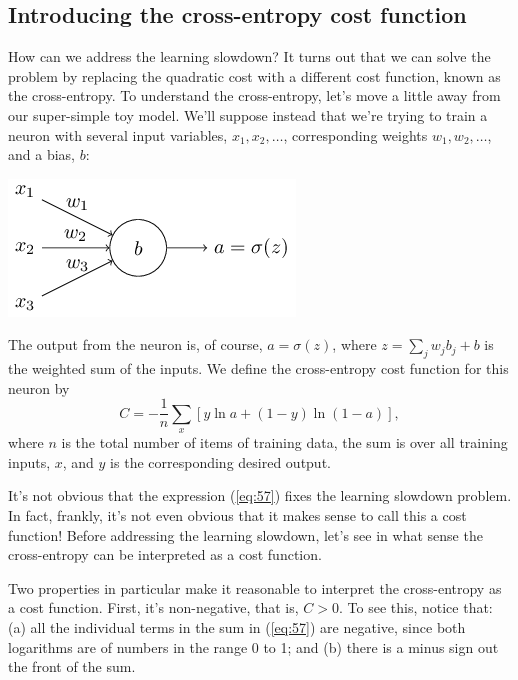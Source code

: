 \documentclass[a4paper,twoside,10pt]{book}
\begin{document}
\subsection{Introducing the cross-entropy cost function}
How can we address the learning slowdown? It turns out that we can solve the problem by replacing the quadratic cost with a different cost function, known as the cross-entropy. To understand the cross-entropy, let's move a little away from our super-simple toy model. We'll suppose instead that we're trying to train a neuron with several input variables, $x_1,x_2,\ldots$, corresponding weights $w_1,w_2,\ldots$, and a bias, $b$:
\begin{center}
	\includegraphics[scale=0.5]{./figures/ch3/tikz29}
\end{center}
The output from the neuron is, of course, $a=\sigma(z)$, where $z=\sum_jw_jb_j+b$ is the weighted sum of the inputs. We define the cross-entropy cost function for this neuron by
\begin{equation}
	C = -\frac{1}{n} \sum_x \left[y \ln a + (1-y ) \ln (1-a) \right],
	\label{eq:57}
\end{equation}
where $n$ is the total number of items of training data, the sum is over all training inputs, $x$, and $y$ is the corresponding desired output.

It's not obvious that the expression (\ref{eq:57}) fixes the learning slowdown problem. In fact, frankly, it's not even obvious that it makes sense to call this a cost function! Before addressing the learning slowdown, let's see in what sense the cross-entropy can be interpreted as a cost function.

Two properties in particular make it reasonable to interpret the cross-entropy as a cost function. First, it's non-negative, that is, $C>0$. To see this, notice that: (a) all the individual terms in the sum in (\ref{eq:57}) are negative, since both logarithms are of numbers in the range 0 to 1; and (b) there is a minus sign out the front of the sum.
\end{document}
